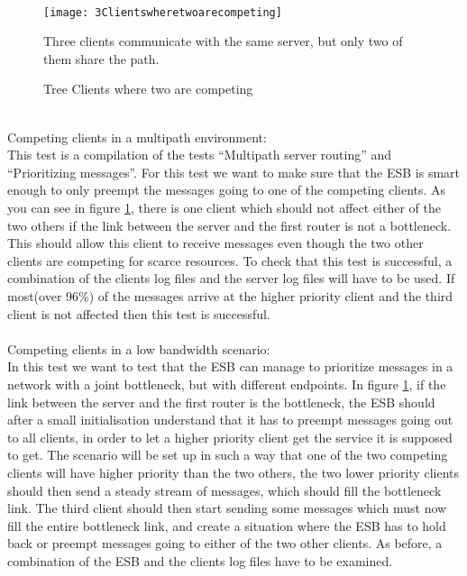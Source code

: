 \\
    \begin{figure}[h]
        \centering
        \texttt{[image: 3Clientswheretwoarecompeting]}
        \caption{Tree Clients where two are competing}
        Three clients communicate with the same server, but only two of them share the path.
        \label{fig:3clientstwocompeting}
    \end{figure}
\\
Competing clients in a multipath environment:\\
    This test is a compilation of the tests “Multipath server routing” and “Prioritizing messages”. For this test we want to make sure that the ESB is smart enough to only preempt the messages going to one of the competing clients. As you can see in figure \ref{fig:3clientstwocompeting}, there is one client which should not affect either of the two others if the link between the server and the first router is not a bottleneck. This should allow this client to receive messages even though the two other clients are competing for scarce resources. To check that this test is successful, a combination of the clients log files and the server log files will have to be used. If most(over 96\%) of the messages arrive at the higher priority client and the third client is not affected then this test is successful.
\\\\
Competing clients in a low bandwidth scenario:\\
    In this test we want to test that the ESB can manage to prioritize messages in a network with a joint bottleneck, but with different endpoints. In figure \ref{fig:3clientstwocompeting}, if the link between the server and the first router is the bottleneck, the ESB should after a small initialisation understand that it has to preempt messages going out to all clients, in order to let a higher priority client get the service it is supposed to get. The scenario will be set up in such a way that one of the two competing clients will have higher priority than the two others, the two lower priority clients should then send a steady stream of messages, which should fill the bottleneck link. The third client should then start sending some messages which must now fill the entire bottleneck link, and create a situation where the ESB has to hold back or preempt messages going to either of the two other clients. As before, a combination of the ESB and the clients log files have to be examined.
           
